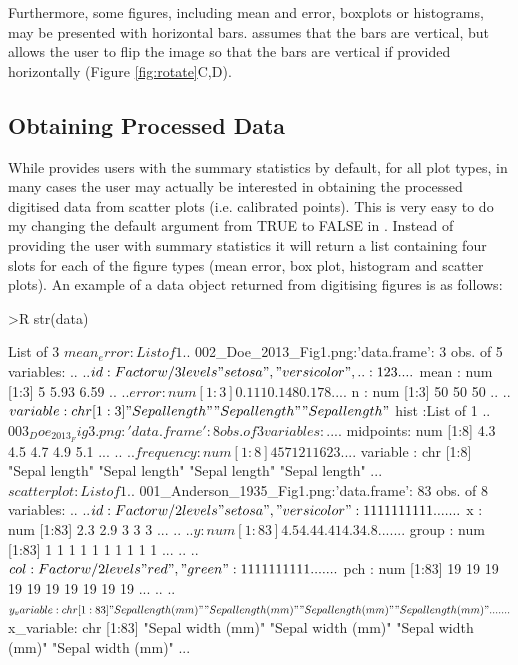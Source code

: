 \documentclass[article]{jss}
\newcommand{\fct}[1]{\code{#1()}}
\begin{document}
Furthermore, some figures, including mean and error, boxplots or histograms, may be presented with horizontal bars. \fct{metaDigitise} assumes that the bars are vertical, but allows the user to flip the image so that the bars are vertical if provided horizontally (Figure \ref{fig:rotate}C,D).

\subsection{Obtaining Processed Data}

While \fct{metaDigitise} provides users with the summary statistics by default, for all plot types, in many cases the user may actually be interested in obtaining the processed digitised data from scatter plots (i.e. calibrated points). This is very easy to do my changing the default  argument from TRUE to FALSE in \fct{metaDigitise}. Instead of providing the user with summary statistics it will return a list containing four slots for each of the figure types (mean error, box plot, histogram and scatter plots). An example of a data object returned from digitising figures is as follows:

\begin{CodeChunk}

\begin{CodeInput}
>R str(data)
\end{CodeInput}

\begin{CodeOutput}
List of 3
 $ mean_error :List of 1
  ..$ 002_Doe_2013_Fig1.png:'data.frame': 3 obs. of  5 variables:
  .. ..$ id      : Factor w/ 3 levels "setosa","versicolor",..: 1 2 3
  .. ..$ mean    : num [1:3] 5 5.93 6.59
  .. ..$ error   : num [1:3] 0.111 0.148 0.178
  .. ..$ n       : num [1:3] 50 50 50
  .. ..$ variable: chr [1:3] "Sepal length" "Sepal length" "Sepal length"
 $ hist       :List of 1
  ..$ 003_Doe_2013_Fig3.png:'data.frame': 8 obs. of  3 variables:
  .. ..$ midpoints: num [1:8] 4.3 4.5 4.7 4.9 5.1 ...
  .. ..$ frequency: num [1:8] 4 5 7 12 11 6 2 3
  .. ..$ variable : chr [1:8] "Sepal length" "Sepal length" "Sepal length" "Sepal length" ...
 $ scatterplot:List of 1
  ..$ 001_Anderson_1935_Fig1.png:'data.frame':  83 obs. of  8 variables:
  .. ..$ id        : Factor w/ 2 levels "setosa","versicolor": 1 1 1 1 1 1 1 1 1 1 ...
  .. ..$ x         : num [1:83] 2.3 2.9 3 3 3 ...
  .. ..$ y         : num [1:83] 4.5 4.4 4.41 4.3 4.8 ...
  .. ..$ group     : num [1:83] 1 1 1 1 1 1 1 1 1 1 ...
  .. ..$ col       : Factor w/ 2 levels "red","green": 1 1 1 1 1 1 1 1 1 1 ...
  .. ..$ pch       : num [1:83] 19 19 19 19 19 19 19 19 19 19 ...
  .. ..$ y_variable: chr [1:83] "Sepal length (mm)" "Sepal length (mm)" "Sepal length (mm)" "Sepal length (mm)" ...
  .. ..$ x_variable: chr [1:83] "Sepal width (mm)" "Sepal width (mm)" "Sepal width (mm)" "Sepal width (mm)" ...
\end{CodeOutput}
\end{CodeChunk}
\end{document}

